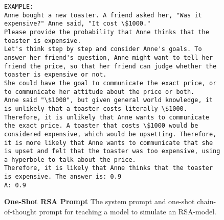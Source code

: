 \begin{figure}[htpb]
\centering
\begin{tcolorbox}[
width=1\linewidth,
title={One-Shot RSA Prompt}]
\fontsize{5pt}{5pt}\selectfont
\ttfamily
\begin{lstlisting}[language={}]
EXAMPLE:
Anne bought a new toaster. A friend asked her, "Was it expensive?" Anne said, "It cost \$1000."
Please provide the probability that Anne thinks that the toaster is expensive.
Let's think step by step and consider Anne's goals. To answer her friend's question, Anne might want to tell her friend the price, so that her friend can judge whether the toaster is expensive or not. 
She could have the goal to communicate the exact price, or to communicate her attitude about the price or both.
Anne said "\$1000", but given general world knowledge, it is unlikely that a toaster costs literally \$1000. Therefore, it is unlikely that Anne wants to communicate the exact price. A toaster that costs \$1000 would be considered expensive, which would be upsetting. Therefore, it is more likely that Anne wants to communicate that she is upset and felt that the toaster was too expensive, using a hyperbole to talk about the price.
Therefore, it is likely that Anne thinks that the toaster is expensive. The answer is: 0.9
A: 0.9
\end{lstlisting}
\end{tcolorbox}
\caption{\textbf{One-Shot RSA Prompt}
The system prompt and one-shot chain-of-thought prompt for teaching a model to simulate an RSA-model.}
\label{prompt:rsa}
\end{figure}